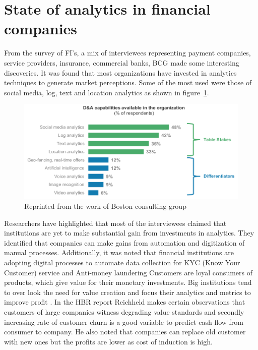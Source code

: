 \newpage
\section{State of analytics in financial companies}
From the survey of FI's, a mix of interviewees representing payment companies, service providers, insurance, commercial banks, BCG made some interesting discoveries. It was found that most organizations have invested in analytics techniques to generate market perceptions. Some of the most used were those of social media, log, text and location analytics as shown in figure~\ref{fig:da_capabilities}.

\begin{figure}[H]
	\includegraphics[scale = 0.5]{figures/DA_capabilities.png}
	\caption[Da capablities]{Reprinted from the work of Boston consulting group  }
	\label{fig:da_capabilities}
\end{figure}
\FloatBarrier

Researchers have highlighted that most of the interviewees claimed that institutions are yet to make substantial gain from investments in analytics. They identified that companies can make gains from automation and digitization of manual processes. Additionally, it was noted that financial institutions are adopting digital processes to automate data collection for KYC (Know Your Customer) service and Anti-money laundering 
Customers are loyal consumers of products, which give value for their monetary investments. Big institutions tend to over look the need for value creation and focus their analytics and metrics to improve profit . In the HBR report Reichheld makes certain  observations that customers of large companies witness degrading value standards and secondly increasing rate of customer churn is a good variable to predict cash flow from consumer to company. He also noted that companies can replace old customer with new ones but the profits are lower as cost of induction is high.

